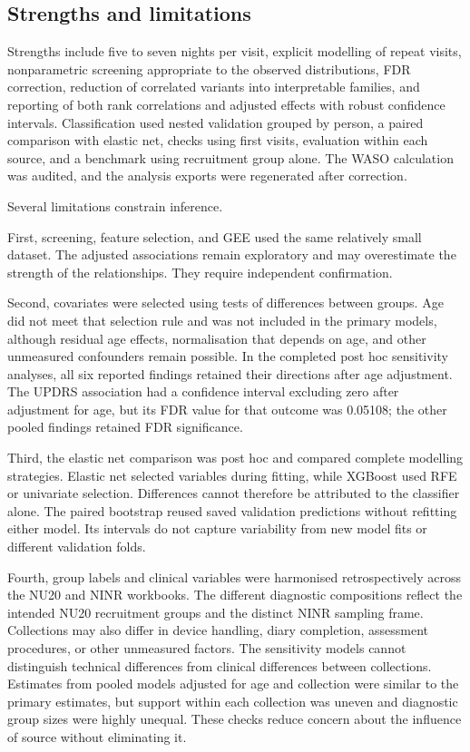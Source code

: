 \documentclass[referee,pdflatex,sn-vancouver-num]{sn-jnl}
\begin{document}
\subsection{Strengths and limitations}\label{subsec:limitations}

Strengths include five to seven nights per visit, explicit modelling of repeat
visits, nonparametric screening appropriate to the observed distributions,
FDR correction, reduction of correlated variants into interpretable families,
and reporting of both rank correlations and adjusted effects with robust
confidence intervals. Classification used nested validation grouped by person,
a paired comparison with elastic net, checks using first visits, evaluation
within each source, and a benchmark using recruitment group alone. The WASO
calculation was audited, and the analysis exports were regenerated after
correction.

Several limitations constrain inference. 

First, screening, feature selection, and GEE used the same relatively small
dataset. The adjusted associations remain exploratory and may overestimate
the strength of the relationships. They require independent confirmation.

Second, covariates were selected using tests of differences between groups.
Age did not meet that selection rule and was not included in the primary
models, although residual age effects, normalisation that depends on age, and other unmeasured
confounders remain possible. In the completed post hoc sensitivity analyses,
all six reported findings retained their directions after age adjustment. The
UPDRS association had a confidence interval excluding zero after adjustment
for age, but its FDR value for that outcome was 0.05108; the other pooled findings retained
FDR significance.

Third, the elastic net comparison was post hoc and compared complete modelling
strategies. Elastic net selected variables during fitting, while XGBoost used
RFE or univariate selection. Differences cannot therefore be attributed to the
classifier alone. The paired bootstrap reused saved validation predictions
without refitting either model. Its intervals do not capture variability from
new model fits or different validation folds.

Fourth, group labels and clinical variables were harmonised retrospectively
across the NU20 and NINR workbooks. The different diagnostic compositions
reflect the intended NU20 recruitment groups and the distinct NINR sampling
frame. Collections may also differ in device handling, diary completion,
assessment procedures, or other unmeasured factors. The sensitivity models
cannot distinguish technical differences from clinical differences between
collections. Estimates from pooled models adjusted for age and collection were
similar to the primary estimates, but support within each collection was
uneven and diagnostic group sizes were highly unequal. These checks reduce
concern about the influence of source without eliminating it.
\end{document}
